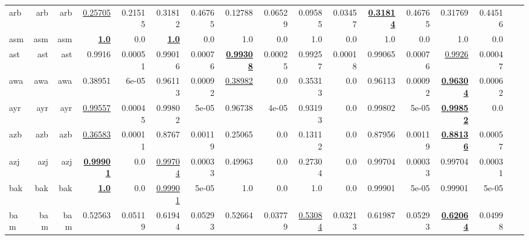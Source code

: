 \documentclass[11pt]{article}
\begin{document}
\begin{table*}[h]
{\begin{tabular}{lrrrrrrrrrrrrrrrr}
arb         & arb         & arb         & \underline{0.25705}         & 0.21515         & 0.31812         & 0.46765         & 0.12788         & 0.06529         & 0.09585         & 0.03457         & \textbf{\underline{0.31814}}         & 0.46765         & 0.31769         & 0.44516         \\
asm         & asm         & asm         & \textbf{\underline{1.0}}         & 0.0         & \textbf{\underline{1.0}}         & 0.0         & 1.0         & 0.0         & 1.0         & 0.0         & 1.0         & 0.0         & 1.0         & 0.0         \\
ast         & ast         & ast         & 0.9916         & 0.00051         & 0.99016         & 0.00076         & \textbf{\underline{0.99308}}         & 0.00025         & 0.99257         & 0.00018         & 0.99065         & 0.00076         & \underline{0.9926}         & 0.00047         \\
awa         & awa         & awa         & 0.38951         & 6e-05         & 0.96113         & 0.00092         & \underline{0.38982}         & 0.0         & 0.35313         & 0.0         & 0.96113         & 0.00092         & \textbf{\underline{0.96304}}         & 0.00062         \\
ayr         & ayr         & ayr         & \underline{0.99557}         & 0.00045         & 0.99802         & 5e-05         & 0.96738         & 4e-05         & 0.93193         & 0.0         & 0.99802         & 5e-05         & \textbf{\underline{0.99852}}         & 0.0         \\
azb         & azb         & azb         & \underline{0.36583}         & 0.00011         & 0.8767         & 0.00119         & 0.25065         & 0.0         & 0.13112         & 0.0         & 0.87956         & 0.00119         & \textbf{\underline{0.88136}}         & 0.00057         \\
azj         & azj         & azj         & \textbf{\underline{0.99901}}         & 0.0         & \underline{0.99704}         & 0.00033         & 0.49963         & 0.0         & 0.27304         & 0.0         & 0.99704         & 0.00033         & 0.99704         & 0.00031         \\
bak         & bak         & bak         & \textbf{\underline{1.0}}         & 0.0         & \underline{0.99901}         & 5e-05         & 1.0         & 0.0         & 1.0         & 0.0         & 0.99901         & 5e-05         & 0.99901         & 5e-05         \\
bam         & bam         & bam         & 0.52563         & 0.05119         & 0.61944         & 0.05293         & 0.52664         & 0.03779         & \underline{0.53084}         & 0.03213         & 0.61987         & 0.05293         & \textbf{\underline{0.62064}}         & 0.04998         \\

\end{tabular}}
\end{table*}
\end{document}
